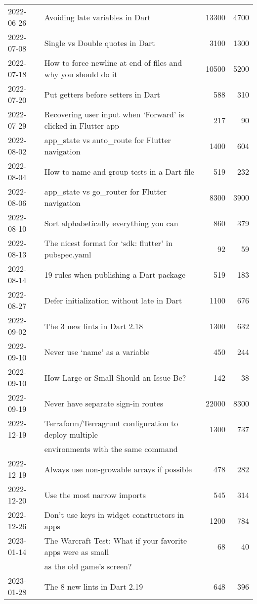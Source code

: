 \begin{longtable}{|l|l|r|r|}
    2022-06-26 & Avoiding late variables in Dart & 13300 & 4700\\
    2022-07-08 & Single vs Double quotes in Dart & 3100 & 1300\\
    2022-07-18 & How to force newline at end of files and why you should do it & 10500 & 5200\\
    2022-07-20 & Put getters before setters in Dart & 588 & 310\\
    2022-07-29 & Recovering user input when `Forward' is clicked in Flutter app & 217 & 90\\
    2022-08-02 & app\_state vs auto\_route for Flutter navigation & 1400 & 604\\
    2022-08-04 & How to name and group tests in a Dart file & 519 & 232\\
    2022-08-06 & app\_state vs go\_router for Flutter navigation & 8300 & 3900\\
    2022-08-10 & Sort alphabetically everything you can & 860 & 379\\
    2022-08-13 & The nicest format for `sdk: flutter' in pubspec.yaml & 92 & 59\\
    2022-08-14 & 19 rules when publishing a Dart package & 519 & 183\\
    2022-08-27 & Defer initialization without late in Dart & 1100 & 676\\
    2022-09-02 & The 3 new lints in Dart 2.18 & 1300 & 632\\
    2022-09-10 & Never use `name' as a variable & 450 & 244\\
    2022-09-10 & How Large or Small Should an Issue Be? & 142 & 38\\
    2022-09-19 & Never have separate sign-in routes & 22000 & 8300\\
    2022-12-19 & Terraform/Terragrunt configuration to deploy multiple & 1300 & 737\\
    & environments with the same command & & \\
    2022-12-19 & Always use non-growable arrays if possible & 478 & 282\\
    2022-12-20 & Use the most narrow imports & 545 & 314\\
    2022-12-26 & Don't use keys in widget constructors in apps & 1200 & 784\\
    2023-01-14 & The Warcraft Test: What if your favorite apps were as small & 68 & 40\\
    & as the old game's screen? & & \\
    2023-01-28 & The 8 new lints in Dart 2.19 & 648 & 396\\

\end{longtable}

